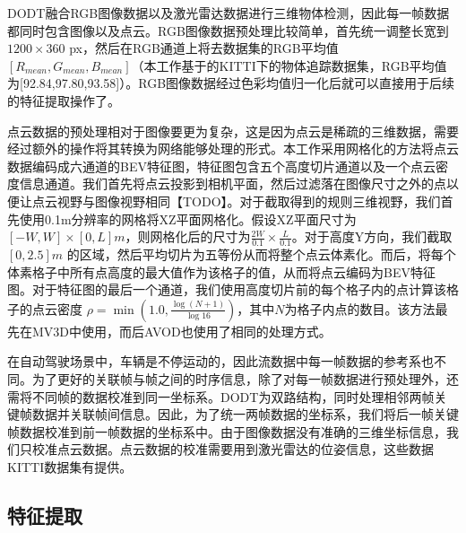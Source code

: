 DODT融合RGB图像数据以及激光雷达数据进行三维物体检测，因此每一帧数据都同时包含图像以及点云。RGB图像数据预处理比较简单，首先统一调整长宽到$1200 \times 360 $ px，然后在RGB通道上将去数据集的RGB平均值$[R_{mean},G_{mean},B_{mean}]$（本工作基于的KITTI下的物体追踪数据集，RGB平均值为[92.84,97.80,93.58]）。RGB图像数据经过色彩均值归一化后就可以直接用于后续的特征提取操作了。

点云数据的预处理相对于图像要更为复杂，这是因为点云是稀疏的三维数据，需要经过额外的操作将其转换为网络能够处理的形式。本工作采用网格化的方法将点云数据编码成六通道的BEV特征图，特征图包含五个高度切片通道以及一个点云密度信息通道。我们首先将点云投影到相机平面，然后过滤落在图像尺寸之外的点以便让点云视野与图像视野相同【TODO】。对于截取得到的规则三维视野，我们首先使用0.1m分辨率的网格将XZ平面网格化。假设XZ平面尺寸为 $[-W,W] \times [0, L] m$，则网格化后的尺寸为$\frac{2W}{0.1} \times \frac{L}{0.1}$。对于高度Y方向，我们截取$[0,2.5] m$ 的区域，然后平均切片为五等份从而将整个点云体素化。而后，将每个体素格子中所有点高度的最大值作为该格子的值，从而将点云编码为BEV特征图。对于特征图的最后一个通道，我们使用高度切片前的每个格子内的点计算该格子的点云密度 $\rho = \min(1.0, \frac{\log(N+1)}{\log 16})$，其中$N$为格子内点的数目。该方法最先在MV3D\cite{chen2017multi}中使用，而后AVOD\cite{ku2018joint}也使用了相同的处理方式。

在自动驾驶场景中，车辆是不停运动的，因此流数据中每一帧数据的参考系也不同。为了更好的关联帧与帧之间的时序信息，除了对每一帧数据进行预处理外，还需将不同帧的数据校准到同一坐标系。DODT为双路结构，同时处理相邻两帧关键帧数据并关联帧间信息。因此，为了统一两帧数据的坐标系，我们将后一帧关键帧数据校准到前一帧数据的坐标系中。由于图像数据没有准确的三维坐标信息，我们只校准点云数据。点云数据的校准需要用到激光雷达的位姿信息，这些数据KITTI数据集有提供。

\subsection{特征提取}



